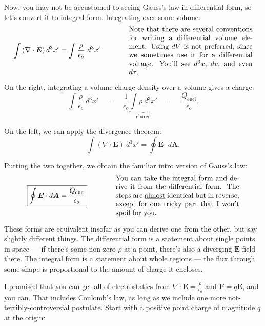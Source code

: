 \documentclass{article}
\numberwithin{equation}{section}
\begin{document}
Now, you may not be accustomed to seeing Gauss's law in differential form, so let's convert it to integral form. Integrating over some volume:
\begin{equation*}
    \int \left( \nabla \cdot \bm{E} \right) d^3x' = \int \frac{\rho}{\epsilon_o}\ d^3x' \qquad\qquad \parbox[c]{0.5\textwidth}{Note that there are several conventions for writing a differential volume element. Using $dV$ is not preferred, since we sometimes use it for a differential voltage. You'll see $d^3x$, $dv$, and even $d\tau$.}
\end{equation*}

On the right, integrating a volume charge density over a volume gives a charge:
\begin{equation*}
    \int \frac{\rho}{\epsilon_o}\ d^3x' \quad = \quad \frac{1}{\epsilon_o} \underbrace{\int \rho\ d^3x'}_{\displaystyle \text{charge}} \quad = \quad \frac{Q_{\text{encl}}}{\epsilon_o}.
\end{equation*}

On the left, we can apply the divergence theorem:
\begin{equation*}
    \int \left( \nabla \cdot \bm{E} \right)\ d^3x' = \oint \bm{E} \cdot d\bm{A}.
\end{equation*}

Putting the two together, we obtain the familiar intro version of Gauss's law:
\begin{equation*}
    \boxed{\oint \bm{E} \cdot d\bm{A} = \frac{Q_{\text{enc}}}{\epsilon_o}} \qquad\qquad \parbox[c]{0.5\textwidth}{You can take the integral form and derive it from the differential form. The steps are \underline{almost} identical but in reverse, except for one tricky part that I won't spoil for you.}
\end{equation*}

These forms are equivalent insofar as you can derive one from the other, but say slightly different things. The differential form is a statement about \underline{single points} in space --- if there's some non-zero $\rho$ at a point, there's also a diverging $\bm{E}$-field there. The integral form is a statement about whole regions --- the flux through some shape is proportional to the amount of charge it encloses.

I promised that you can get all of electrostatics from $\displaystyle \nabla \cdot \bm{E} = \frac{\rho}{\epsilon_o}$ and $\bm{F} = q\bm{E}$, and you can. That includes Coulomb's law, as long as we include one more not-terribly-controversial postulate. Start with a positive point charge of magnitude $q$ at the origin:
\end{document}
